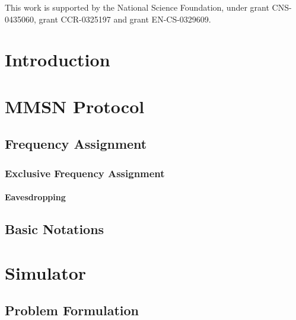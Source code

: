 \documentclass[prodmode,acmtecs]{acmsmall} %
\begin{document}



\begin{bottomstuff}
This work is supported by the National Science Foundation, under
grant CNS-0435060, grant CCR-0325197 and grant EN-CS-0329609.
\end{bottomstuff}

\maketitle


\section{Introduction}


\section{MMSN Protocol}

\subsection{Frequency Assignment}


\subsubsection{Exclusive Frequency Assignment}


\paragraph{Eavesdropping}


\subsection{Basic Notations}


\section{Simulator}
\label{sec:sim}


\subsection{Problem Formulation}
\end{document}
